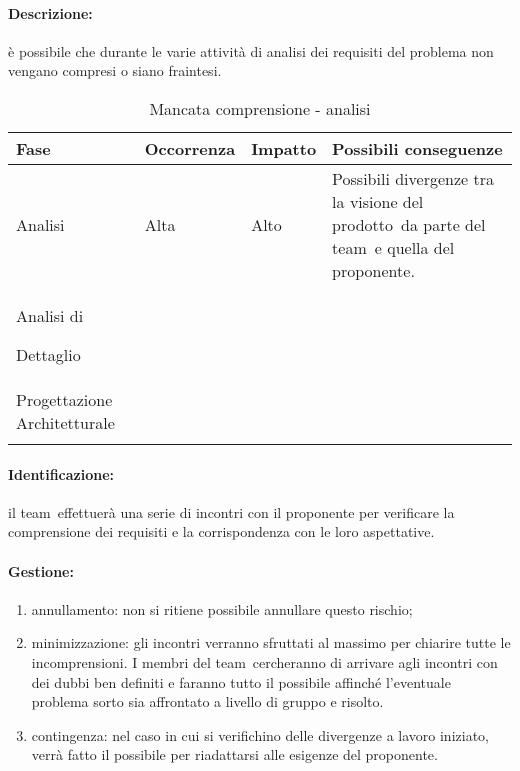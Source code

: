 \documentclass[../PianoProgetto.tex]{subfiles}
\begin{document}
	\paragraph*{Descrizione:} è possibile che durante le varie attività di analisi dei requisiti del problema non vengano compresi o siano fraintesi.
	
	
	\begin{table}[h]
		\centering
		\begin{tabularx}{\textwidth}{F O O P}
			\toprule
			\textbf{Fase} & \textbf{Occorrenza} & \textbf{Impatto} & \textbf{Possibili conseguenze}\\
			\midrule
			Analisi & Alta & Alto & Possibili divergenze tra la visione del prodotto\g\ da parte del team\g\ e quella del proponente. \\
			\midrule
			Analisi di \par Dettaglio & & & \\
			\midrule
			Progettazione Architetturale & & & \\
			\bottomrule
		\end{tabularx}
		\caption{Mancata comprensione - analisi}
		\label{tab:Mancata comprensione - analisi}	
	\end{table}
		
	\paragraph*{Identificazione:} il team\g\ effettuerà una serie di incontri con il proponente per verificare la comprensione dei requisiti e la corrispondenza con le loro aspettative.
	
	\paragraph*{Gestione:}
	\begin{enumerate}
		\item annullamento: non si ritiene possibile annullare questo rischio;
		\item minimizzazione: gli incontri verranno sfruttati al massimo per chiarire tutte le incomprensioni. I membri del team\g\ cercheranno di arrivare agli incontri con dei dubbi ben definiti e faranno tutto il possibile affinché l'eventuale problema sorto sia affrontato a livello di gruppo e risolto.
		\item contingenza: nel caso in cui si verifichino delle divergenze a lavoro iniziato, verrà fatto il possibile per riadattarsi alle esigenze del proponente.
	\end{enumerate}	
	
\end{document}
